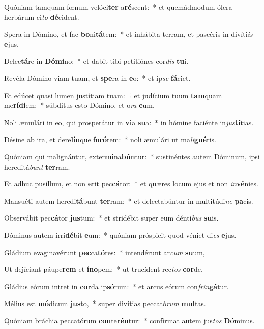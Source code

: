 \item Quóniam tamquam fœnum velóci\textbf{ter} a\textbf{ré}scent:~* et quemádmodum ólera herbárum ci\textit{to} \textbf{dé}cident.
\item Spera in Dómino, et fac \textbf{bo}ni\textbf{tá}tem:~* et inhábita terram, et pascéris in divíti\textit{is} \textbf{e}jus.
\item Delec\textbf{tá}re in \textbf{Dó}\textbf{mi}no:~* et dabit tibi petitiónes cor\textit{dis} \textbf{tu}i.
\item Revéla Dómino viam tuam, et \textbf{spe}ra in \textbf{e}o:~* et ip\textit{se} \textbf{fá}ciet.
\item Et edúcet quasi lumen justítiam tuam:~† et judícium tuum \textbf{tam}quam me\textbf{rí}\textbf{di}em:~* súbditus esto Dómino, et o\textit{ra} \textbf{e}um.
\item Noli æmulári in eo, qui prosperátur in \textbf{vi}a \textbf{su}a:~* in hómine faciénte in\textit{jus}\textbf{tí}tias.
\item Désine ab ira, et dere\textbf{lín}que fu\textbf{ró}rem:~* noli æmulári ut ma\textit{li}\textbf{gné}ris.
\item Quóniam qui malignántur, exter\textbf{mi}na\textbf{bún}tur:~* sustinéntes autem Dóminum, ipsi hereditá\textit{bunt} \textbf{ter}ram.
\item Et adhuc pusíllum, et non \textbf{e}rit pec\textbf{cá}tor:~* et quæres locum ejus et non \textit{in}\textbf{vé}nies.
\item Mansuéti autem heredi\textbf{tá}bunt \textbf{ter}ram:~* et delectabúntur in multitúdi\textit{ne} \textbf{pa}cis.
\item Observábit pec\textbf{cá}tor \textbf{jus}tum:~* et stridébit super eum dénti\textit{bus} \textbf{su}is.
\item Dóminus autem irri\textbf{dé}bit \textbf{e}um:~* quóniam próspicit quod véniet di\textit{es} \textbf{e}jus.
\item Gládium evaginavérunt \textbf{pec}ca\textbf{tó}res:~* intendérunt ar\textit{cum} \textbf{su}um,
\item Ut dejíciant páupe\textbf{rem} et \textbf{ín}\textbf{o}pem:~* ut trucídent rec\textit{tos} \textbf{cor}de.
\item Gládius eórum intret in \textbf{cor}da ip\textbf{só}rum:~* et arcus eórum con\textit{frin}\textbf{gá}tur.
\item Mélius est \textbf{mó}dicum \textbf{jus}to,~* super divítias peccató\textit{rum} \textbf{mul}tas.
\item Quóniam bráchia peccatórum \textbf{con}te\textbf{rén}tur:~* confírmat autem jus\textit{tos} \textbf{Dó}minus.
